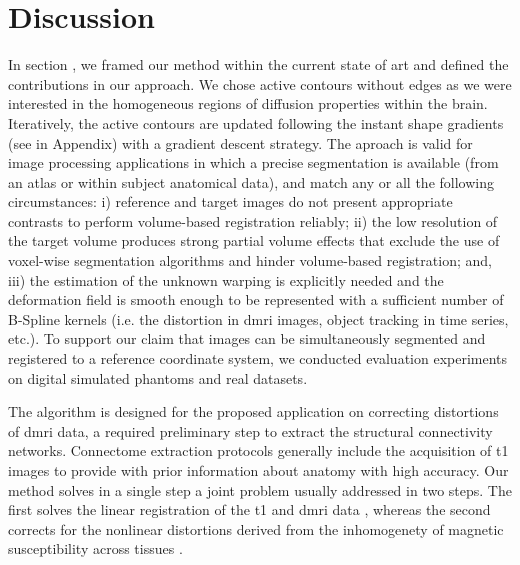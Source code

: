 \section*{Discussion}
\label{sec:discussion}
In section , we framed our method within the current
  state of art and defined the contributions in our approach.
We chose active contours without edges as we were interested in the homogeneous
  regions of diffusion properties within the brain.
Iteratively, the active contours are updated following the instant shape gradients
  (see  in Appendix) with a gradient descent strategy.
The aproach is valid for image processing applications in which a precise segmentation is
  available (from an atlas or within subject anatomical data), and match any or all
  the following circumstances:
  i) reference and target images do not present appropriate contrasts to
  	perform volume-based registration reliably;
  ii) the low resolution of the target volume produces strong partial volume effects
  	that exclude the use of voxel-wise segmentation algorithms and hinder volume-based
  	registration; and,
  iii) the estimation of the unknown warping is explicitly needed and the
    deformation field is smooth enough to be represented with a sufficient number
  	of B-Spline kernels (i.e. the distortion in \gls*{dmri} images,
  	object tracking in time series, etc.).
To support our claim that images can be simultaneously segmented and registered to a
  reference coordinate system, we conducted evaluation experiments on digital
  simulated phantoms and real datasets.

The algorithm is designed for the proposed application on correcting distortions of
  \gls*{dmri} data, a required preliminary step to extract the structural connectivity
  networks.
Connectome extraction protocols generally include the acquisition of \gls*{t1} images
  to provide with prior information about anatomy with high accuracy.
Our method solves in a single step a joint problem usually addressed in two steps.
The first solves the linear registration of the \gls*{t1} and \gls*{dmri} data
  \citep{greve_accurate_2009}, whereas the second corrects for the nonlinear distortions
  derived from the inhomogenety of magnetic susceptibility across tissues
  \citep{jezzard_correction_1995}.



